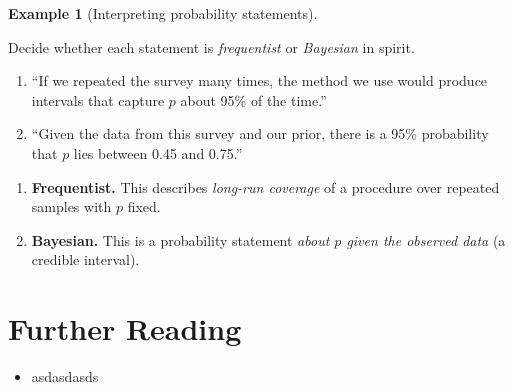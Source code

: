 \documentclass[
  letterpaper,
  DIV=11,
  numbers=noendperiod]{scrreprt}
\providecommand{\tightlist}{%
  \setlength{\itemsep}{0pt}\setlength{\parskip}{0pt}}
\theoremstyle{definition}
\newtheorem{example}{Example}[chapter]
\theoremstyle{plain}
\theoremstyle{definition}
\theoremstyle{remark}
\begin{document}
\begin{example}[Interpreting probability
statements]\protect\hypertarget{exm-interpretations}{}\label{exm-interpretations}

Decide whether each statement is \emph{frequentist} or \emph{Bayesian}
in spirit.

\begin{enumerate}
\def\labelenumi{\arabic{enumi}.}
\tightlist
\item
  ``If we repeated the survey many times, the method we use would
  produce intervals that capture \(p\) about 95\% of the time.''\\
\item
  ``Given the data from this survey and our prior, there is a 95\%
  probability that \(p\) lies between 0.45 and 0.75.''
\end{enumerate}

\end{example}

\begin{tcolorbox}[enhanced jigsaw, left=2mm, toprule=.15mm, breakable, opacityback=0, titlerule=0mm, toptitle=1mm, colbacktitle=quarto-callout-tip-color!10!white, colframe=quarto-callout-tip-color-frame, coltitle=black, rightrule=.15mm, leftrule=.75mm, bottomrule=.15mm, arc=.35mm, bottomtitle=1mm, title=\textcolor{quarto-callout-tip-color}{\faLightbulb}\hspace{0.5em}{Solution}, colback=white, opacitybacktitle=0.6]

\begin{enumerate}
\def\labelenumi{\arabic{enumi}.}
\tightlist
\item
  \textbf{Frequentist.} This describes \emph{long-run coverage} of a
  procedure over repeated samples with \(p\) fixed.\\
\item
  \textbf{Bayesian.} This is a probability statement \emph{about \(p\)
  given the observed data} (a credible interval).
\end{enumerate}

\end{tcolorbox}

\section*{Further Reading}\label{further-reading}


\begin{itemize}
\tightlist
\item
  asdasdasds
\end{itemize}
\end{document}
